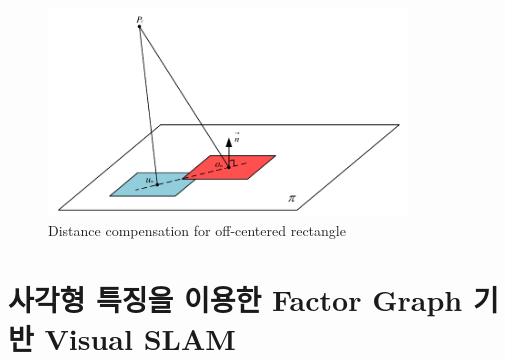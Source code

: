 \documentclass[master,korean,final]{cbnu-ecs}
\begin{document}
\begin{figure}[!ht]
  \centering
	\includegraphics[width=360px]{img/depth_compensate_cropped.pdf}
  \caption{Distance compensation for off-centered rectangle}
\label{depth_compensate}
\end{figure}

\chapter{사각형 특징을 이용한 Factor Graph 기반 Visual SLAM}
\end{document}
